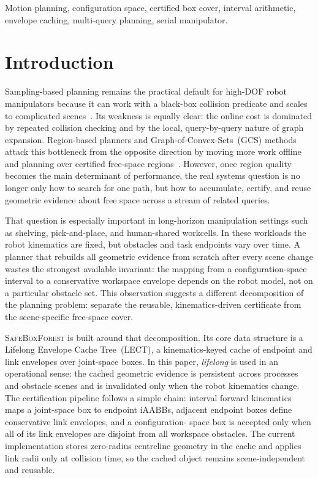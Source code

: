 \documentclass[journal]{IEEEtran}
\newcommand{\iAABB}{\ensuremath{\mathrm{iAABB}}}
\begin{document}
\begin{IEEEkeywords}
Motion planning, configuration space, certified box cover, interval arithmetic,
envelope caching, multi-query planning, serial manipulator.
\end{IEEEkeywords}

\section{Introduction}\label{sec:intro}

Sampling-based planning remains the practical default for high-DOF robot
manipulators because it can work with a black-box collision predicate and scales
to complicated scenes~\cite{lavalle2006planning,lavalle1998rapidly,
kavraki1996probabilistic,karaman2011sampling}. Its weakness is equally clear:
the online cost is dominated by repeated collision checking and by the local,
query-by-query nature of graph expansion. Region-based planners and
Graph-of-Convex-Sets~(GCS) methods attack this bottleneck from the opposite
direction by moving more work offline and planning over certified free-space
regions~\cite{deits2015computing,marcucci2023motion,marcucci2024shortest}.
However, once region quality becomes the main determinant of performance, the
real systems question is no longer only how to search for one path, but how to
accumulate, certify, and reuse geometric evidence about free space across a
stream of related queries.

That question is especially important in long-horizon manipulation settings such
as shelving, pick-and-place, and human-shared workcells. In these workloads the
robot kinematics are fixed, but obstacles and task endpoints vary over time. A
planner that rebuilds all geometric evidence from scratch after every scene
change wastes the strongest available invariant: the mapping from a
configuration-space interval to a conservative workspace envelope depends on the
robot model, not on a particular obstacle set. This observation suggests a
different decomposition of the planning problem: separate the reusable,
kinematics-driven certificate from the scene-specific free-space cover.

\textsc{SafeBoxForest} is built around that decomposition. Its core data
structure is a Lifelong Envelope Cache Tree~(LECT), a kinematics-keyed cache of
endpoint and link envelopes over joint-space boxes. In this paper,
\emph{lifelong} is used in an operational sense: the cached geometric evidence
is persistent across processes and obstacle scenes and is invalidated only when
the robot kinematics change. The certification pipeline follows a simple chain:
interval forward kinematics maps a joint-space box to endpoint \iAABB s,
adjacent endpoint boxes define conservative link envelopes, and a configuration-
space box is accepted only when all of its link envelopes are disjoint from all
workspace obstacles. The current implementation stores zero-radius centreline
geometry in the cache and applies link radii only at collision time, so the
cached object remains scene-independent and reusable.
\end{document}
